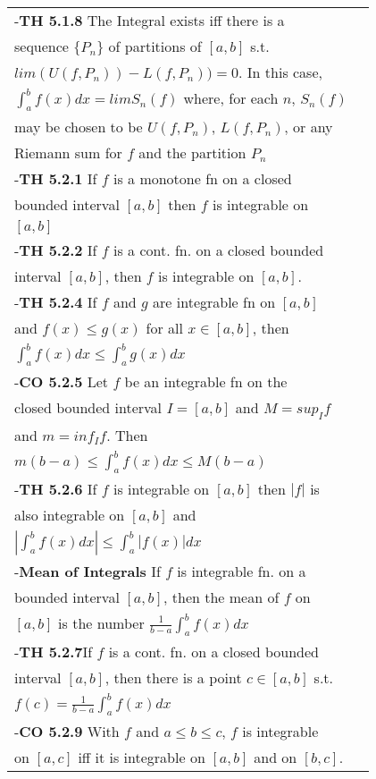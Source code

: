 \documentclass[10 pt,landscape]{article}
\begin{document}
\begin{multicols}{4}
\begin{tabular}{@{}ll@{}}
-\textbf{TH 5.1.8} The Integral exists iff there is a\\ sequence $\{P_n\}$ of partitions of $[a,b]$ s.t.\\ $lim(U(f,P_n))-L(f,P_n))=0$. In this case,\\
$\int_{a}^{b}f(x)dx=limS_n(f)$ where, for each $n$, $S_n(f)$\\ may be chosen to be $U(f,P_n)$, $L(f,P_n)$, or any \\Riemann sum for $f$ and the partition $P_n$\\
-\textbf{TH 5.2.1} If $f$ is a monotone fn on a closed\\ bounded interval $[a,b]$ then $f$ is integrable on\\ $[a,b]$\\
-\textbf{TH 5.2.2} If $f$ is a cont. fn. on a closed bounded \\interval $[a,b]$, then $f$ is integrable on $[a,b]$. \\
-\textbf{TH 5.2.4} If $f$ and $g$ are integrable fn on $[a,b]$\\ and $f(x) \leq g(x)$ for all $x \in [a,b]$, then\\ $\int_{a}^{b}f(x)dx \leq \int_{a}^{b}g(x)dx$\\
-\textbf{CO 5.2.5} Let $f$ be an integrable fn on the \\ closed bounded interval $I=[a,b]$ and $M=sup_I f$\\ and $m=inf_I f$. Then \\$m(b-a) \leq \int_{a}^{b}f(x)dx \leq M(b-a)$\\
-\textbf{TH 5.2.6} If $f$ is integrable on $[a,b]$ then $|f|$ is \\ also integrable on $[a,b]$ and \\
$|\int_{a}^{b}f(x)dx| \leq \int_{a}^{b}|f(x)|dx$\\
-\textbf{Mean of Integrals} If $f$ is integrable fn. on a \\ bounded interval $[a,b]$, then the mean of $f$ on \\$[a,b]$ is the number $\frac{1}{b-a}\int_{a}^{b}f(x)dx$\\

-\textbf{TH 5.2.7}If $f$ is a cont. fn. on a closed bounded\\ interval $[a,b]$, then there is a point $c \in [a,b]$ s.t. \\ $f(c)=\frac{1}{b-a} \int_{a}^{b} f(x)dx$\\
-\textbf{CO 5.2.9} With $f$ and $a \leq b \leq c$, $f$ is integrable\\ on $[a,c]$ iff it is integrable on $[a,b]$ and on $[b,c]$.\\
\end{tabular} 



\end{multicols}
\end{document}
